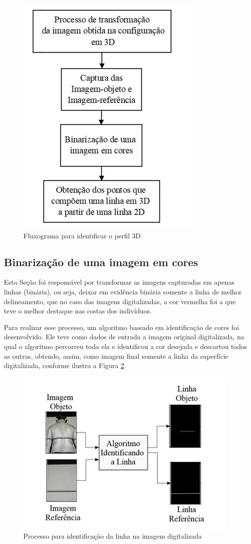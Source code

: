 \documentclass[a4paper, 12pt]{article}
\begin{document}
\begin{figure}[H]
	\centering
		\includegraphics[width=.55\linewidth]{fluxograma_identificar_3D.png}
	\caption{Fluxograma para identificar o perfil 3D}
	\label{fluxograma_identificar_3D}
\end{figure}

\subsection{Binarização de uma imagem em cores}

Esta Seção foi responsável por transformar as imagens capturadas em apenas linhas (binária), ou seja, deixar em evidência binária somente a linha de melhor delineamento, que no caso das imagens digitalizadas, a cor vermelha foi a que teve o melhor destaque nas costas dos indivíduos.

Para realizar esse processo, um algoritmo baseado em identificação de cores foi desenvolvido. Ele teve como dados de entrada a imagem original digitalizada, na qual o algoritmo percorreu toda ela e identificou a cor desejada e descartou todos as outras, obtendo, assim, como imagem final somente a linha da superfície digitalizada, conforme ilustra a Figura \ref{identificar linha na imagem}.

\begin{figure}[H]
	\centering
		\includegraphics[width=.55\linewidth]{identificar_linha_imagem.png}
	\caption{Processo para identificação da linha na imagem digitalizada}
	\label{identificar linha na imagem}
\end{figure}
\end{document}
